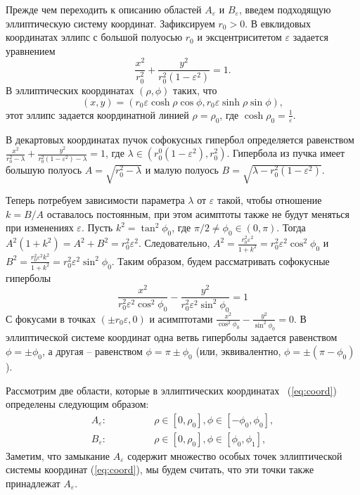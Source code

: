 Прежде чем переходить к описанию областей $A_\varepsilon$ и  $B_\varepsilon$, введем подходящую эллиптическую систему координат.
Зафиксируем $r_0>0$. 
В евклидовых координатах эллипс с большой полуосью  $r_0$ и эксцентриситетом  $\varepsilon$ 
задается уравнением
$$
\frac{x^2}{r_0^2} + \frac{y^2}{r_0^2(1-\varepsilon^2)}=1.
$$
В эллиптических координатах
$(\rho,\phi)$ таких, что
\begin{equation}
\label{eq:coord}
(x, y) = (r_0\varepsilon \cosh \rho \cos \phi , r_0\varepsilon \sinh \rho \sin \phi),
\end{equation}
этот эллипс задается координатной линией $\rho=\rho_0$,
где $\cosh \rho_0 = \frac{1}{\varepsilon}$.

В декартовых координатах пучок софокусных гипербол определяется равенством
$\frac{x^2}{r_0^2 - \lambda} + \frac{y^2}{r_0^2(1-\varepsilon^2) - \lambda} = 1$, где $\lambda\in (r_0^0 (1-\varepsilon^2),r_0^2)$.
Гипербола из пучка имеет большую полуось
 $A=\sqrt{r_0^2 - \lambda}$
и малую полуось $ B=\sqrt{\lambda - r_0^2(1-\varepsilon^2)}$.
 
Теперь потребуем зависимости параметра $\lambda $ от  $\varepsilon$ такой, чтобы отношение $k=B/A$ оставалось постоянным, при этом асимптоты также не будут меняться при изменениях $\varepsilon$. Пусть $k^2 = \tan ^2 \phi_0$, где $\pi/2\ne \phi_0\in (0,\pi) $.
 Тогда $A^2(1+k^2) = A^2+B^2 = r_0^2\varepsilon^2.$
 Следовательно, $A^2=\frac{r_0^2\varepsilon^2}{1+k^2} = r_0^2\varepsilon^2\cos^2\phi_0$ и
 $B^2=\frac{r_0^2\varepsilon^2k^2}{1+k^2} = r_0^2\varepsilon^2\sin^2\phi_0$.
 Таким образом, будем рассматривать софокусные гиперболы
 \begin{equation}\label{eq:hyper}
 \frac{x^2}{r_0^2\varepsilon^2\cos^2\phi_0}  -  \frac{y^2}{r_0^2\varepsilon^2\sin^2\phi_0}  =1
 \end{equation}
С фокусами в точках $(\pm r_0\varepsilon,0)$ и асимптотами
 $
  \frac{x^2}{\cos^2\phi_0}  -  \frac{y^2}{\sin^2\phi_0}  =0.
 $
В эллиптической системе координат одна ветвь гиперболы задается равенством $\phi = \pm\phi_0$, а другая -- равенством $\phi =\pi\pm\phi_0$ (или, эквивалентно, $\phi =\pm(\pi-\phi_0)$).
 
Рассмотрим две области, которые в эллиптических координатах ~(\ref{eq:coord})
определены следующим образом:
$$
\begin{aligned}
 A_\varepsilon:&\qquad\qquad \rho \in [0, \rho_0], \phi \in [-\phi_0, \phi_0 ],\\
  B_\varepsilon:&\qquad\qquad  \rho \in [0, \rho_0], \phi \in [\phi_0, \phi_1 ], 
\end{aligned}
$$
Заметим, что замыкание  $A_\varepsilon$ содержит множество особых точек эллиптической системы координат (\ref{eq:coord}), мы будем считать, что эти точки также принадлежат $A_\varepsilon$.


